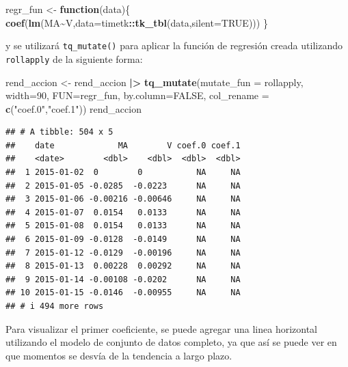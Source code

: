 \documentclass[
]{book}
\newenvironment{Shaded}{\begin{snugshade}}{\end{snugshade}}
\newcommand{\AttributeTok}[1]{\textcolor[rgb]{0.13,0.29,0.53}{#1}}
\newcommand{\ConstantTok}[1]{\textcolor[rgb]{0.56,0.35,0.01}{#1}}
\newcommand{\ControlFlowTok}[1]{\textcolor[rgb]{0.13,0.29,0.53}{\textbf{#1}}}
\newcommand{\DecValTok}[1]{\textcolor[rgb]{0.00,0.00,0.81}{#1}}
\newcommand{\FunctionTok}[1]{\textcolor[rgb]{0.13,0.29,0.53}{\textbf{#1}}}
\newcommand{\NormalTok}[1]{#1}
\newcommand{\OtherTok}[1]{\textcolor[rgb]{0.56,0.35,0.01}{#1}}
\newcommand{\SpecialCharTok}[1]{\textcolor[rgb]{0.81,0.36,0.00}{\textbf{#1}}}
\newcommand{\StringTok}[1]{\textcolor[rgb]{0.31,0.60,0.02}{#1}}
\begin{document}
\begin{Shaded}
\begin{Highlighting}[]
\NormalTok{regr\_fun }\OtherTok{\textless{}{-}} \ControlFlowTok{function}\NormalTok{(data)\{}
  \FunctionTok{coef}\NormalTok{(}\FunctionTok{lm}\NormalTok{(MA}\SpecialCharTok{\textasciitilde{}}\NormalTok{V,}\AttributeTok{data=}\NormalTok{timetk}\SpecialCharTok{::}\FunctionTok{tk\_tbl}\NormalTok{(data,}\AttributeTok{silent=}\ConstantTok{TRUE}\NormalTok{)))}
\NormalTok{\}}
\end{Highlighting}
\end{Shaded}

y se utilizará \texttt{tq\_mutate()} para aplicar la función de regresión creada utilizando \texttt{rollapply} de la siguiente forma:

\begin{Shaded}
\begin{Highlighting}[]
\NormalTok{rend\_accion }\OtherTok{\textless{}{-}}\NormalTok{ rend\_accion }\SpecialCharTok{|\textgreater{}} \FunctionTok{tq\_mutate}\NormalTok{(}\AttributeTok{mutate\_fun =}\NormalTok{ rollapply,}
                                              \AttributeTok{width=}\DecValTok{90}\NormalTok{,}
                                              \AttributeTok{FUN=}\NormalTok{regr\_fun,}
                                              \AttributeTok{by.column=}\ConstantTok{FALSE}\NormalTok{,}
                                              \AttributeTok{col\_rename =} \FunctionTok{c}\NormalTok{(}\StringTok{"coef.0"}\NormalTok{,}\StringTok{"coef.1"}\NormalTok{))}
\NormalTok{rend\_accion}
\end{Highlighting}
\end{Shaded}

\begin{verbatim}
## # A tibble: 504 x 5
##    date             MA        V coef.0 coef.1
##    <date>        <dbl>    <dbl>  <dbl>  <dbl>
##  1 2015-01-02  0        0           NA     NA
##  2 2015-01-05 -0.0285  -0.0223      NA     NA
##  3 2015-01-06 -0.00216 -0.00646     NA     NA
##  4 2015-01-07  0.0154   0.0133      NA     NA
##  5 2015-01-08  0.0154   0.0133      NA     NA
##  6 2015-01-09 -0.0128  -0.0149      NA     NA
##  7 2015-01-12 -0.0129  -0.00196     NA     NA
##  8 2015-01-13  0.00228  0.00292     NA     NA
##  9 2015-01-14 -0.00108 -0.0202      NA     NA
## 10 2015-01-15 -0.0146  -0.00955     NA     NA
## # i 494 more rows
\end{verbatim}

Para visualizar el primer coeficiente, se puede agregar una linea horizontal utilizando el modelo de conjunto de datos completo, ya que así se puede ver en que momentos se desvía de la tendencia a largo plazo.
\end{document}
